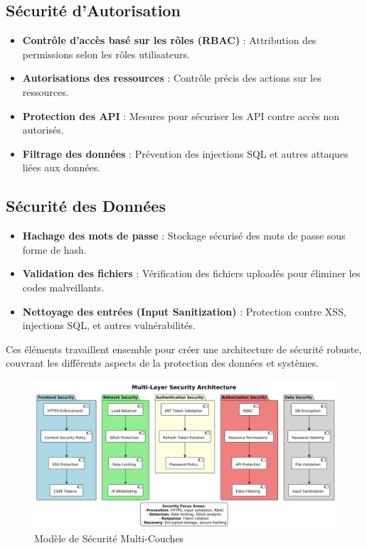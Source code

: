 \documentclass{rapportPfe}
\begin{document}
\subsection*{Sécurité d'Autorisation}
\begin{itemize}
  \item \textbf{Contrôle d'accès basé sur les rôles (RBAC)} : Attribution des permissions selon les rôles utilisateurs.
  \item \textbf{Autorisations des ressources} : Contrôle précis des actions sur les ressources.
  \item \textbf{Protection des API} : Mesures pour sécuriser les API contre accès non autorisés.
  \item \textbf{Filtrage des données} : Prévention des injections SQL et autres attaques liées aux données.
\end{itemize}

\subsection*{Sécurité des Données}
\begin{itemize}

  \item \textbf{Hachage des mots de passe} : Stockage sécurisé des mots de passe sous forme de hash.
  \item \textbf{Validation des fichiers} : Vérification des fichiers uploadés pour éliminer les codes malveillants.
  \item \textbf{Nettoyage des entrées (Input Sanitization)} : Protection contre XSS, injections SQL, et autres vulnérabilités.
\end{itemize}

Ces éléments travaillent ensemble pour créer une architecture de sécurité robuste, couvrant les différents aspects de la protection des données et systèmes.


\begin{figure}[htbp]
    \centering
    \includegraphics[width=1.1\textwidth]{diagrams/diagram6.png}
    \caption{Modèle de Sécurité Multi-Couches}
    \label{fig:diagram6}
\end{figure}
\end{document}
